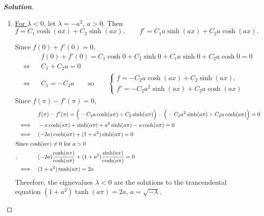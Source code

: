 \documentclass[a4paper,12pt]{article} %
\theoremstyle{plain}
\begin{document}
\begin{proof}[\textbf{Solution}] %
    \begin{enumerate}[label=\alph*.)]
        \item  \underline{For $\lambda < 0$}, let $\lambda = -a^2$, $a>0$. Then \begin{equation*}
        f = C_1 \cosh (a x) + C_2 \sinh (ax), \qquad f' =  C_1 a\sinh (a x) + C_2 a\cosh (ax).
        \end{equation*}
        
        Since $f(0) + f'(0) = 0$,
        \begin{align*}
            &&&f(0) + f'(0) = C_1 \cosh 0 + C_2 \sinh 0 + C_1 a \sinh 0 + C_2 a \cosh 0 = 0\\
            &\iff& &C_1 + C_2 a = 0 \\
            &\iff& &C_1 = -C_2 a  \qquad \text{so}\qquad \begin{cases}
                f=-C_2 a \cosh (ax) + C_2 \sinh(ax),\\
                f'=-C_2 a^2 \sinh(ax) + C_2 a \cosh(ax)
            \end{cases}
        \end{align*}
        Since $f(\pi) -f'(\pi) = 0$,
        \begin{align*}
            && &f(\pi) - f'(\pi) = \Big(-C_2a \cosh (a\pi) + C_2 \sinh (a\pi)\Big) - \Big(-  C_2a^2\sinh (a \pi) + C_2 a\cosh (a\pi)\Big) =0 \\
            &\iff&& -a \cosh(a\pi) + \sinh(a\pi) + a^2 \sinh(a\pi) - a \cosh(a\pi) = 0\\
            &\iff&& (-2a)\cosh(a\pi) + (1+a^2)\sinh(a\pi) = 0\\
            \intertext{Since $\cosh(a\pi) \neq 0$ for $a>0$},
            &&&(-2a)\frac{\cosh(a\pi)}{\cosh(a\pi)} + (1+a^2)\frac{\sinh(a\pi)}{\cosh(a\pi)} = 0 \\
            &\iff&& (1+a^2)\tanh (a\pi) = 2a
        \end{align*}
        Therefore, the eignevalues $\lambda <0$ are the solutions to the trancendental equation $(1+a^2)\tanh (a\pi) = 2a$, $a=\sqrt{-\lambda}$.
    

\end{enumerate}
\end{proof}
\end{document}
